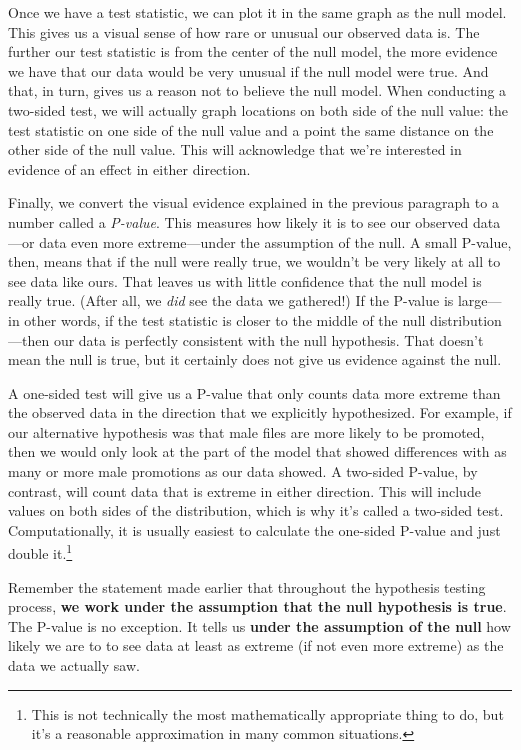 \documentclass[
]{book}
\begin{document}
Once we have a test statistic, we can plot it in the same graph as the null model. This gives us a visual sense of how rare or unusual our observed data is. The further our test statistic is from the center of the null model, the more evidence we have that our data would be very unusual if the null model were true. And that, in turn, gives us a reason not to believe the null model. When conducting a two-sided test, we will actually graph locations on both side of the null value: the test statistic on one side of the null value and a point the same distance on the other side of the null value. This will acknowledge that we're interested in evidence of an effect in either direction.

Finally, we convert the visual evidence explained in the previous paragraph to a number called a \emph{P-value}. This measures how likely it is to see our observed data---or data even more extreme---under the assumption of the null. A small P-value, then, means that if the null were really true, we wouldn't be very likely at all to see data like ours. That leaves us with little confidence that the null model is really true. (After all, we \emph{did} see the data we gathered!) If the P-value is large---in other words, if the test statistic is closer to the middle of the null distribution---then our data is perfectly consistent with the null hypothesis. That doesn't mean the null is true, but it certainly does not give us evidence against the null.

A one-sided test will give us a P-value that only counts data more extreme than the observed data in the direction that we explicitly hypothesized. For example, if our alternative hypothesis was that male files are more likely to be promoted, then we would only look at the part of the model that showed differences with as many or more male promotions as our data showed. A two-sided P-value, by contrast, will count data that is extreme in either direction. This will include values on both sides of the distribution, which is why it's called a two-sided test. Computationally, it is usually easiest to calculate the one-sided P-value and just double it.\footnote{This is not technically the most mathematically appropriate thing to do, but it's a reasonable approximation in many common situations.}

Remember the statement made earlier that throughout the hypothesis testing process, \textbf{we work under the assumption that the null hypothesis is true}. The P-value is no exception. It tells us \textbf{under the assumption of the null} how likely we are to to see data at least as extreme (if not even more extreme) as the data we actually saw.
\end{document}
